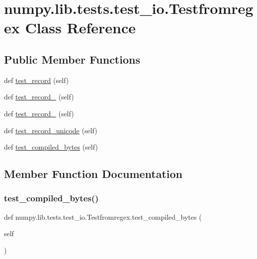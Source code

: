 \hypertarget{classnumpy_1_1lib_1_1tests_1_1test__io_1_1Testfromregex}{}\section{numpy.\+lib.\+tests.\+test\+\_\+io.\+Testfromregex Class Reference}
\label{classnumpy_1_1lib_1_1tests_1_1test__io_1_1Testfromregex}
\subsection*{Public Member Functions}
\begin{DoxyCompactItemize}
\item 
def \hyperlink{classnumpy_1_1lib_1_1tests_1_1test__io_1_1Testfromregex_ae40526623209aa102c6a99764cbd0241}{test\+\_\+record} (self)
\item 
def \hyperlink{classnumpy_1_1lib_1_1tests_1_1test__io_1_1Testfromregex_a1232cabb8b48869573e2c9ad4f80f9fb}{test\+\_\+record\+\_} (self)
\item 
def \hyperlink{classnumpy_1_1lib_1_1tests_1_1test__io_1_1Testfromregex_ab26e2a51b895c8d938eba50b0d49e3a9}{test\+\_\+record\+\_} (self)
\item 
def \hyperlink{classnumpy_1_1lib_1_1tests_1_1test__io_1_1Testfromregex_a3af9c8860c90c108b223aaa730a2704c}{test\+\_\+record\+\_\+unicode} (self)
\item 
def \hyperlink{classnumpy_1_1lib_1_1tests_1_1test__io_1_1Testfromregex_a81b0f5d747fce26e546f00029986646e}{test\+\_\+compiled\+\_\+bytes} (self)
\end{DoxyCompactItemize}


\subsection{Member Function Documentation}
\mbox{\label{classnumpy_1_1lib_1_1tests_1_1test__io_1_1Testfromregex_a81b0f5d747fce26e546f00029986646e}} 
\subsubsection{\texorpdfstring{test\+\_\+compiled\+\_\+bytes()}{test\_compiled\_bytes()}}
{\footnotesize\ttfamily def numpy.\+lib.\+tests.\+test\+\_\+io.\+Testfromregex.\+test\+\_\+compiled\+\_\+bytes (\begin{DoxyParamCaption}\item[{}]{self }\end{DoxyParamCaption})}

